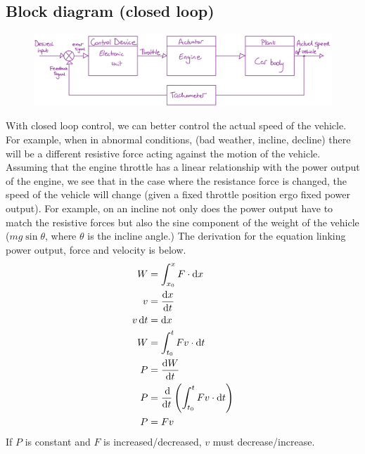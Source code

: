\documentclass[12pt]{article}
\numberwithin{equation}{section}
\begin{document}
\subsection*{Block diagram (closed loop)}
\begin{figure}[H]
  \centering
  \includegraphics[width=\textwidth]{./img/1-2blockdiagram.png}
\end{figure}
With closed loop control, we can better control the actual speed of the vehicle. For example, when in abnormal conditions, (bad weather, incline, decline) there will be a different resistive force acting against the motion of the vehicle. Assuming that the engine throttle has a linear relationship with the power output of the engine, we see that in the case where the resistance force is changed, the speed of the vehicle will change (given a fixed throttle position ergo fixed power output). For example, on an incline not only does the power output have to match the resistive forces but also the sine component of the weight of the vehicle ($mg\sin{\theta}$, where $\theta$ is the incline angle.) The derivation for the equation linking power output, force and velocity is below.
\begin{align}
  W &= \int_{x_0}^{x} F \cdot \textrm{d}x\\
  v &= \frac{\dif x}{\dif t}\\
  v\dif t &= \dif x\\
  W &= \int_{t_0}^{t} Fv\cdot \textrm{d} t\\
  P &= \frac{\dif W}{\dif t}\\
  P &= \frac{\dif}{\dif t}\left(\int_{t_0}^{t} Fv\cdot \textrm{d} t\right)\\
  P &= Fv
\end{align}
If $P$ is constant and $F$ is increased/decreased, $v$ must decrease/increase.
\end{document}
